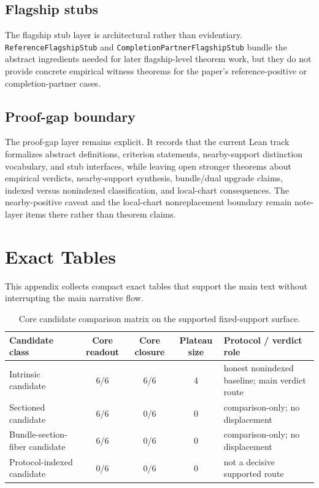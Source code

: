 \documentclass[11pt]{article}
\theoremstyle{definition}
\begin{document}
\subsection*{Flagship stubs}

The flagship stub layer is architectural rather than evidentiary. \texttt{ReferenceFlagshipStub} and \texttt{CompletionPartnerFlagshipStub} bundle the abstract ingredients needed for later flagship-level theorem work, but they do not provide concrete empirical witness theorems for the paper's reference-positive or completion-partner cases.

\subsection*{Proof-gap boundary}

The proof-gap layer remains explicit. It records that the current Lean track formalizes abstract definitions, criterion statements, nearby-support distinction vocabulary, and stub interfaces, while leaving open stronger theorems about empirical verdicts, nearby-support synthesis, bundle/dual upgrade claims, indexed versus nonindexed classification, and local-chart consequences. The nearby-positive caveat and the local-chart nonreplacement boundary remain note-layer items there rather than theorem claims.
 \section{Exact Tables}
\label{app:exact-tables}

This appendix collects compact exact tables that support the main text without interrupting the main narrative flow.

\begin{table}[htbp]
\centering
\small
\begin{tabularx}{\linewidth}{@{}l c c c X@{}}
\toprule
Candidate class & Core readout & Core closure & Plateau size & Protocol / verdict role \\
\midrule
Intrinsic candidate & 6/6 & 6/6 & 4 & honest nonindexed baseline; main verdict route \\
Sectioned candidate & 6/6 & 0/6 & 0 & comparison-only; no displacement \\
Bundle-section-fiber candidate & 6/6 & 0/6 & 0 & comparison-only; no displacement \\
Protocol-indexed candidate & 0/6 & 0/6 & 0 & not a decisive supported route \\
\bottomrule
\end{tabularx}
\caption{Core candidate comparison matrix on the supported fixed-support surface.}
\label{tab:appendix-core-candidate-matrix}
\end{table}
\end{document}

